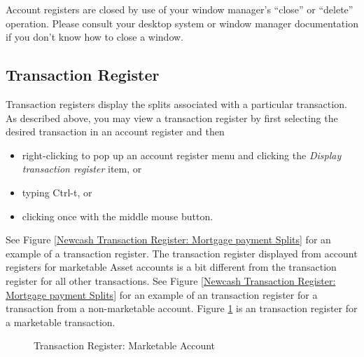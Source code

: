 \documentclass{report}
\newcommand{\graphicsfig}[5]{
\begin{figure}[#5]
\begin{center}
\resizebox{#1}{!}{\texttt{[image: \#2]}}
\end{center}
\caption{#3}
\label{#4}
\end{figure}
}
\begin{document}
Account registers are closed by use of your window manager's ``close'' or ``delete'' operation. Please consult your desktop system or window manager documentation if you don't know how to close a window.

\subsection{Transaction Register}
\label{Transaction register}
Transaction registers display the splits associated with a particular transaction. As described above, you may view a transaction register by first selecting the desired transaction in an account register and then 
\begin{itemize}
\item right-clicking to pop up an account register menu and clicking the \emph{Display transaction register} item, or 
\item typing Ctrl-t, or
\item clicking once with the middle mouse button.
\end{itemize}

See Figure \ref{Newcash Transaction Register: Mortgage payment Splits} for an example of a transaction register.
The transaction register displayed from account registers for marketable Asset accounts is a bit different from the transaction register for all other transactions. See Figure \ref{Newcash Transaction Register: Mortgage payment Splits} for an example of an transaction register for a transaction from a non-marketable account. Figure \ref{Transaction Register: Marketable Account} is an transaction register for a marketable transaction.
\graphicsfig{5in}{figures/marketable_account_transaction_register.png}{Transaction Register: Marketable Account}{Transaction Register: Marketable Account}{h!}
\end{document}
